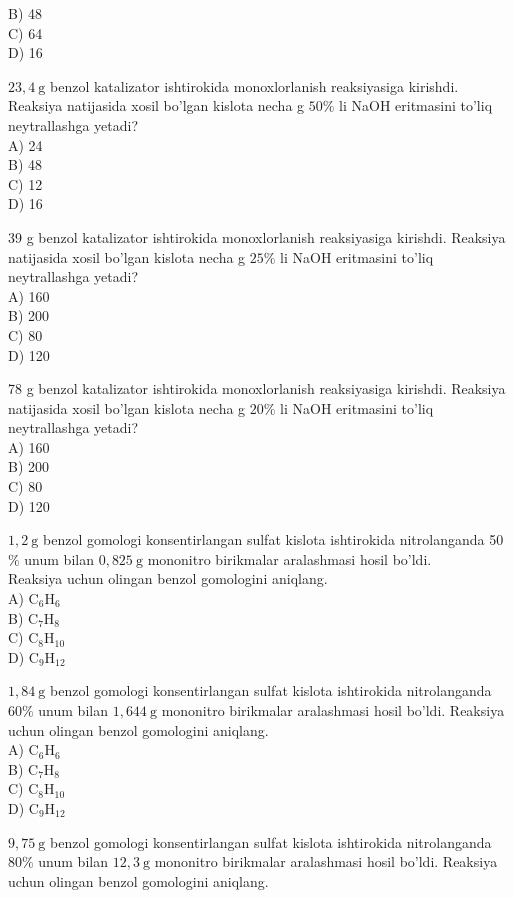 B) 48\\
C) 64\\
D) 16
  \item $23,4 \mathrm{~g}$ benzol katalizator ishtirokida monoxlorlanish reaksiyasiga kirishdi. Reaksiya natijasida xosil bo'lgan kislota necha g $50 \%$ li NaOH eritmasini to'liq neytrallashga yetadi?\\
A) 24\\
B) 48\\
C) 12\\
D) 16
  \item 39 g benzol katalizator ishtirokida monoxlorlanish reaksiyasiga kirishdi. Reaksiya natijasida xosil bo'lgan kislota necha g $25 \%$ li NaOH eritmasini to'liq neytrallashga yetadi?\\
A) 160\\
B) 200\\
C) 80\\
D) 120
  \item 78 g benzol katalizator ishtirokida monoxlorlanish reaksiyasiga kirishdi. Reaksiya natijasida xosil bo'lgan kislota necha g $20 \%$ li NaOH eritmasini to'liq neytrallashga yetadi?\\
A) 160\\
B) 200\\
C) 80\\
D) 120
  \item $1,2 \mathrm{~g}$ benzol gomologi konsentirlangan sulfat kislota ishtirokida nitrolanganda 50 $\%$ unum bilan $0,825 \mathrm{~g}$ mononitro birikmalar aralashmasi hosil bo'ldi.\\
Reaksiya uchun olingan benzol gomologini aniqlang.\\
A) $\mathrm{C}_{6} \mathrm{H}_{6}$\\
B) $\mathrm{C}_{7} \mathrm{H}_{8}$\\
C) $\mathrm{C}_{8} \mathrm{H}_{10}$\\
D) $\mathrm{C}_{9} \mathrm{H}_{12}$
  \item $1,84 \mathrm{~g}$ benzol gomologi konsentirlangan sulfat kislota ishtirokida nitrolanganda $60 \%$ unum bilan $1,644 \mathrm{~g}$ mononitro birikmalar aralashmasi hosil bo'ldi. Reaksiya uchun olingan benzol gomologini aniqlang.\\
A) $\mathrm{C}_{6} \mathrm{H}_{6}$\\
B) $\mathrm{C}_{7} \mathrm{H}_{8}$\\
C) $\mathrm{C}_{8} \mathrm{H}_{10}$\\
D) $\mathrm{C}_{9} \mathrm{H}_{12}$
  \item $9,75 \mathrm{~g}$ benzol gomologi konsentirlangan sulfat kislota ishtirokida nitrolanganda $80 \%$ unum bilan $12,3 \mathrm{~g}$ mononitro birikmalar aralashmasi hosil bo'ldi. Reaksiya uchun olingan benzol gomologini aniqlang.\\
